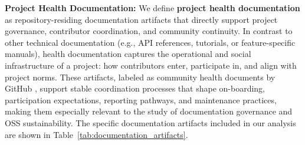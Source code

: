 \documentclass[10pt,conference]{IEEEtran}
\begin{document}
\textbf{Project Health Documentation:}
\label{sec:Health_docs}
We define \textbf{project health documentation} as repository-residing documentation artifacts that directly support project governance, contributor coordination, and community continuity. 
In contrast to other technical documentation (e.g., API references, tutorials, or feature-specific manuals), health documentation captures the operational and social infrastructure of a project: how contributors enter, participate in, and align with project norms. 
These artifacts, labeled as community health documents by GitHub \cite{github_community_health}, support stable coordination processes that shape on-boarding, participation expectations, reporting pathways, and maintenance practices, making them especially relevant to the study of documentation governance and OSS sustainability.
The specific documentation artifacts included in our analysis are shown in Table~\ref{tab:documentation_artifacts}.
\vspace{-10pt}
\end{document}
